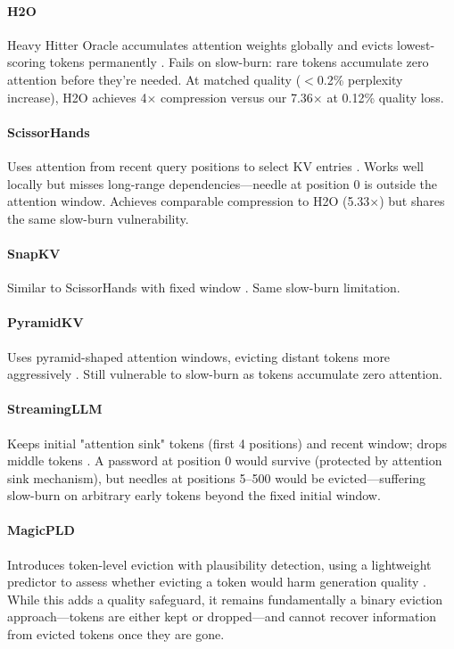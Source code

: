 \documentclass[11pt]{article}
\begin{document}
\paragraph{H2O} Heavy Hitter Oracle accumulates attention weights globally and evicts lowest-scoring tokens permanently \cite{h2o}. Fails on slow-burn: rare tokens accumulate zero attention before they're needed. At matched quality ($<$0.2\% perplexity increase), H2O achieves 4$\times$ compression versus our 7.36$\times$ at 0.12\% quality loss.

\paragraph{ScissorHands} Uses attention from recent query positions to select KV entries \cite{scissorhands}. Works well locally but misses long-range dependencies---needle at position 0 is outside the attention window. Achieves comparable compression to H2O (5.33$\times$) but shares the same slow-burn vulnerability.

\paragraph{SnapKV} Similar to ScissorHands with fixed window \cite{snapkv}. Same slow-burn limitation.

\paragraph{PyramidKV} Uses pyramid-shaped attention windows, evicting distant tokens more aggressively \cite{pyramidkv}. Still vulnerable to slow-burn as tokens accumulate zero attention.

\paragraph{StreamingLLM} Keeps initial "attention sink" tokens (first 4 positions) and recent window; drops middle tokens \cite{streamingllm}. A password at position 0 would survive (protected by attention sink mechanism), but needles at positions 5--500 would be evicted---suffering slow-burn on arbitrary early tokens beyond the fixed initial window.

\paragraph{MagicPLD} Introduces token-level eviction with plausibility detection, using a lightweight predictor to assess whether evicting a token would harm generation quality \cite{magicpld}. While this adds a quality safeguard, it remains fundamentally a binary eviction approach---tokens are either kept or dropped---and cannot recover information from evicted tokens once they are gone.
\end{document}

